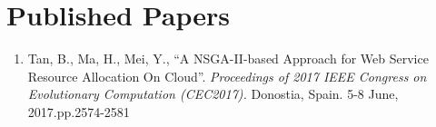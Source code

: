 \section{Published Papers}

\begin{enumerate}
	\item Tan, B., Ma, H., Mei, Y., ``A NSGA-II-based Approach for Web Service Resource Allocation On Cloud''. \textit{
	Proceedings of 2017 IEEE Congress on Evolutionary Computation (CEC2017). } Donostia, Spain. 5-8 June, 2017.pp.2574-2581 



\end{enumerate}

